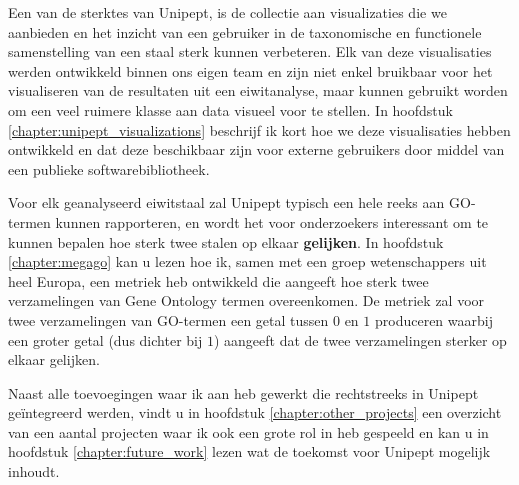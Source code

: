 Een van de sterktes van Unipept, is de collectie aan visualizaties die we aanbieden en het inzicht van een gebruiker in de taxonomische en functionele samenstelling van een staal sterk kunnen verbeteren.
Elk van deze visualisaties werden ontwikkeld binnen ons eigen team en zijn niet enkel bruikbaar voor het visualiseren van de resultaten uit een eiwitanalyse, maar kunnen gebruikt worden om een veel ruimere klasse aan data visueel voor te stellen.
In hoofdstuk \ref{chapter:unipept_visualizations} beschrijf ik kort hoe we deze visualisaties hebben ontwikkeld en dat deze beschikbaar zijn voor externe gebruikers door middel van een publieke softwarebibliotheek.

Voor elk geanalyseerd eiwitstaal zal Unipept typisch een hele reeks aan GO-termen kunnen rapporteren, en wordt het voor onderzoekers interessant om te kunnen bepalen hoe sterk twee stalen op elkaar \textbf{gelijken}.
In hoofdstuk \ref{chapter:megago} kan u lezen hoe ik, samen met een groep wetenschappers uit heel Europa, een metriek heb ontwikkeld die aangeeft hoe sterk twee verzamelingen van Gene Ontology termen overeenkomen.
De metriek zal voor twee verzamelingen van GO-termen een getal tussen $0$ en $1$ produceren waarbij een groter getal (dus dichter bij $1$) aangeeft dat de twee verzamelingen sterker op elkaar gelijken.

Naast alle toevoegingen waar ik aan heb gewerkt die rechtstreeks in Unipept geïntegreerd werden, vindt u in hoofdstuk \ref{chapter:other_projects} een overzicht van een aantal projecten waar ik ook een grote rol in heb gespeeld en kan u in hoofdstuk \ref{chapter:future_work} lezen wat de toekomst voor Unipept mogelijk inhoudt.
